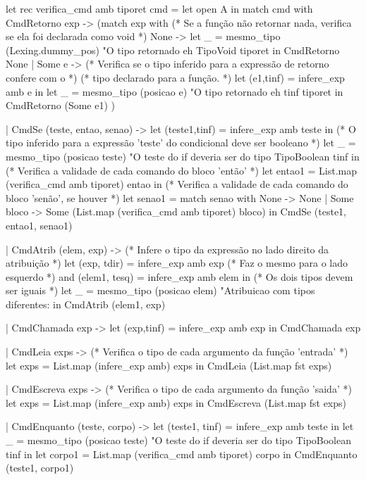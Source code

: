 \documentclass[12pt,a4paper,twoside]{report}
\begin{document}
\begin{terminal}
let rec verifica_cmd amb tiporet cmd =
  let open A in
  match cmd with
  CmdRetorno exp ->
    (match exp with
     (* Se a função não retornar nada, verifica se ela foi declarada como void *)
       None ->
       let _ = mesmo_tipo (Lexing.dummy_pos)
                   "O tipo retornado eh %
                   TipoVoid tiporet
       in CmdRetorno None
     | Some e ->
       (* Verifica se o tipo inferido para a expressão de retorno confere com o *)
       (* tipo declarado para a função.                                         *)
           let (e1,tinf) = infere_exp amb e in
           let _ = mesmo_tipo (posicao e)
                              "O tipo retornado eh %
                              tinf tiporet
           in CmdRetorno (Some e1)
      )

  | CmdSe (teste, entao, senao) ->
    let (teste1,tinf) = infere_exp amb teste in
    (* O tipo inferido para a expressão 'teste' do condicional deve ser booleano *)
    let _ = mesmo_tipo (posicao teste)
             "O teste do if deveria ser do tipo %
             TipoBoolean tinf in
    (* Verifica a validade de cada comando do bloco 'então' *)
    let entao1 = List.map (verifica_cmd amb tiporet) entao in
    (* Verifica a validade de cada comando do bloco 'senão', se houver *)
    let senao1 =
        match senao with
          None -> None
        | Some bloco -> Some (List.map (verifica_cmd amb tiporet) bloco)
     in
     CmdSe (teste1, entao1, senao1)

  | CmdAtrib (elem, exp) ->
    (* Infere o tipo da expressão no lado direito da atribuição *)
    let (exp,  tdir) = infere_exp amb exp
    (* Faz o mesmo para o lado esquerdo *)
    and (elem1, tesq) = infere_exp amb elem in
    (* Os dois tipos devem ser iguais *)
    let _ = mesmo_tipo (posicao elem)
                       "Atribuicao com tipos diferentes: %
    in CmdAtrib (elem1, exp)

  | CmdChamada exp ->
     let (exp,tinf) = infere_exp amb exp in
     CmdChamada exp

  | CmdLeia exps ->
    (* Verifica o tipo de cada argumento da função 'entrada' *)
    let exps = List.map (infere_exp amb) exps in
    CmdLeia (List.map fst exps)

  | CmdEscreva exps ->
    (* Verifica o tipo de cada argumento da função 'saida' *)
    let exps = List.map (infere_exp amb) exps in
    CmdEscreva (List.map fst exps)

  | CmdEnquanto (teste, corpo) ->
    let (teste1, tinf) = infere_exp amb teste in
    let _ = mesmo_tipo (posicao teste)
	     "O teste do if deveria ser do tipo %
             TipoBoolean tinf in
    let corpo1 = List.map (verifica_cmd  amb tiporet) corpo in
    CmdEnquanto (teste1, corpo1)


\end{terminal}
\end{document}
